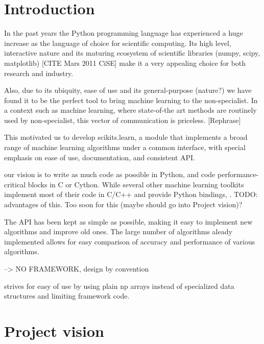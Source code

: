 \documentclass[twoside,11pt]{article}
\begin{document}
\section{Introduction}
In the past years the Python programming language has experienced a
huge increase as the language of choice for scientific computing. Its
high level, interactive nature and its maturing ecosystem of
scientific libraries (numpy, scipy, matplotlib) [CITE Mars 2011 CiSE]
make it a very appealing choice for both research and industry.

Also, due to its ubiquity, ease of use and its general-purpose
(nature?) we have found it to be the perfect tool to bring machine
learning to the non-specialist. In a context such as machine learning,
where state-of-the art methods are routinely used by non-specialist,
this vector of communication is priceless. [Rephrase]

This motivated us to develop scikits.learn, a module that implements a
broad range of machine learning algorithms under a common interface,
with special emphasis on ease of use, documentation, and consistent API.


our vision is
to write as much code as possible in Python, and code
performance-critical blocks in C or Cython.
While several other machine learning toolkits implement
most of their code in C/C++ and provide Python bindings, . TODO: advantages of
this. Too soon for this (maybe should go into Project vision)?


The API has been kept as simple as possible, making it easy to
implement new algorithms and improve old ones. The large number of
algorithms aleady implemented allows for easy comparison of accuracy
and performance of various algorithms.

--> NO FRAMEWORK, design by convention

strives for easy of use by using plain np arrays instead of specialized
data structures and limiting framework code.


\section{Project vision}
\end{document}

